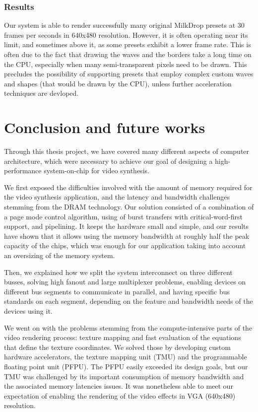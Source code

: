 \documentclass[a4paper,11pt]{kthesis}
\begin{document}
\subsection{Results}
Our system is able to render successfully many original MilkDrop presets at 30 frames per seconds in 640x480 resolution. However, it is often operating near its limit, and sometimes above it, as some presets exhibit a lower frame rate. This is often due to the fact that drawing the waves and the borders take a long time on the CPU, especially when many semi-transparent pixels need to be drawn. This precludes the possibility of supporting presets that employ complex custom waves and shapes (that would be drawn by the CPU), unless further acceleration techniques are devloped.

\chapter{Conclusion and future works}
\label{ch:conclusion}
Through this thesis project, we have covered many different aspects of computer architecture, which were necessary to achieve our goal of designing a high-performance system-on-chip for video synthesis.

We first exposed the difficulties involved with the amount of memory required for the video synthesis application, and the latency and bandwidth challenges stemming from the DRAM technology. Our solution consisted of a combination of a page mode control algorithm, using of burst transfers with critical-word-first support, and pipelining. It keeps the hardware small and simple, and our results have shown that it allows using the memory bandwidth at roughly half the peak capacity of the chips, which was enough for our application taking into account an oversizing of the memory system.

Then, we explained how we split the system interconnect on three different busses, solving high fanout and large multiplexer problems, enabling devices on different bus segments to communicate in parallel, and having specific bus standards on each segment, depending on the feature and bandwidth needs of the devices using it.

We went on with the problems stemming from the compute-intensive parts of the video rendering process: texture mapping and fast evaluation of the equations that define the texture coordinates. We solved those by developing custom hardware accelerators, the texture mapping unit (TMU) and the programmable floating point unit (PFPU). The PFPU easily exceeded its design goals, but our TMU was challenged by its important consumption of memory bandwidth and the associated memory latencies issues. It was nonetheless able to meet our expectation of enabling the rendering of the video effects in VGA (640x480) resolution.
\end{document}
